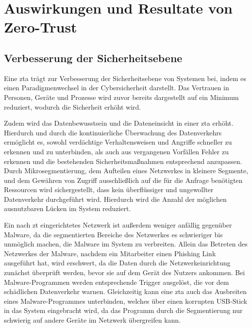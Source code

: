 \section{Auswirkungen und Resultate von Zero-Trust}\label{sec:auswirkungen-und-resultate-von-zero-trust}

\subsection{Verbesserung der Sicherheitsebene}\label{subsec:verbesserung-der-sicherheitsebene}
Eine \ac{zta} trägt zur Verbesserung der Sicherheitsebene von Systemen bei, indem es einen Paradigmenwechsel in der Cybersicherheit darstellt.
Das Vertrauen in Personen, Geräte und Prozesse wird zuvor bereits dargestellt auf ein Minimum reduziert, wodurch die Sicherheit erhöht wird.

Zudem wird das Datenbewusstsein und die Dateneinsicht in einer \ac{zta} erhöht.
Hierdurch und durch die kontinuierliche Überwachung des Datenverkehrs ermöglicht es, sowohl verdächtige Verhaltensweisen und Angriffe schneller zu erkennen und zu unterbinden, als auch aus vergangenen Vorfällen Fehler zu erkennen und die bestehenden Sicherheitsmaßnahmen entsprechend anzupassen.\autocites[\vglf][]{cunningham-2019}[\vglf][]{buck-2021}
Durch Mikrosegmentierung, dem Aufteilen eines Netzwerkes in kleinere Segmente, und dem Gewähren von Zugriff ausschließlich auf die für die Anfrage benötigten Ressourcen wird sichergestellt, dass kein überflüssiger und ungewollter Datenverkehr durchgeführt wird.\autocite[\vglf][]{shore-2021}
Hierdurch wird die Anzahl der möglichen ausnutzbaren Lücken im System reduziert.

Ein nach \ac{zt} eingerichtetes Netzwerk ist außerdem weniger anfällig gegenüber Malware, da die segmentierten Bereiche des Netzwerkes es schwieriger bis unmöglich machen, die Malware im System zu verbreiten.
Allein das Betreten des Netzwerkes der Malware, nachdem \zb ein Mitarbeiter einen Phishing Link ausgeführt hat, wird erschwert, da die Daten durch die Netzwerkeinrichtung zunächst überprüft werden, bevor sie auf dem Gerät des Nutzers ankommen.\autocite[\vglf][]{cunningham-2019}
Bei Malware-Programmen werden entsprechende Trigger ausgelöst, die vor dem schädlichen Datenverkehr warnen.\autocite[\vglf][]{cunningham-2019}
Gleichzeitig kann eine \ac{zta} auch das Ausbreiten eines Malware-Programmes unterbinden, welches \zb über einen korrupten USB-Stick in das System eingebracht wird, da das Programm durch die Segmentierung nur schwierig auf andere Geräte im Netzwerk übergreifen kann.\autocite[\vglf][]{cunningham-2019}

